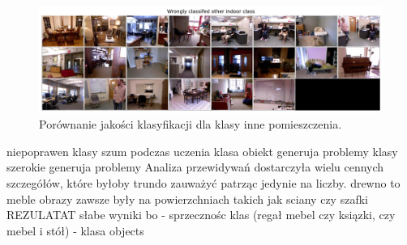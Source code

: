 \begin{figure}[ht!]
    \centering
    \includegraphics[width=\textwidth]{img/preds_analysis/classification/other_indoor.png}
    \caption{Porównanie jakości klasyfikacji dla klasy inne pomieszczenia.}
    \label{fig:oter_indoor-false-pred}
\end{figure}

niepoprawen klasy szum podczas uczenia
klasa obiekt generuja problemy klasy szerokie generuja problemy
Analiza przewidywań dostarczyła wielu cennych szczegółów, które byłoby trundo zauważyć patrząc jedynie na liczby.
drewno to meble
obrazy zawsze były na powierzchniach takich jak sciany czy szafki
REZULATAT
słabe wyniki bo
- sprzecznośc klas (regał mebel czy ksiązki, czy mebel i stół)
- klasa objects

    
    
